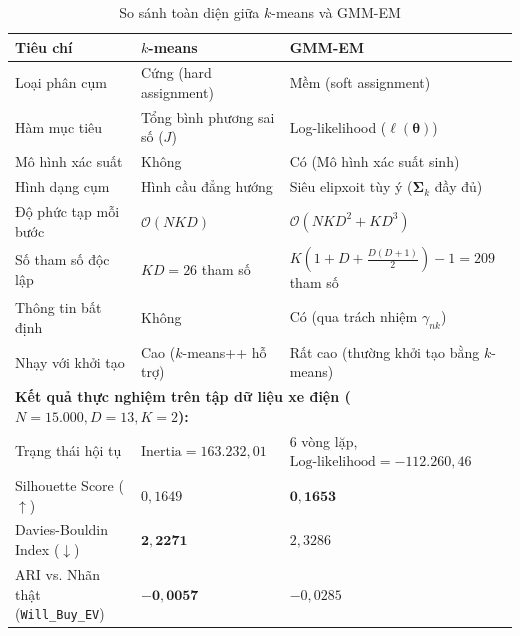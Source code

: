 \begin{table}[htbp]
  \centering
  \small
  \renewcommand{\arraystretch}{1.25}
  \caption{So sánh toàn diện giữa $k$-means và GMM-EM}
  \label{tab:kmeans_vs_gmm}
  \begin{tabularx}{\linewidth}{lXX}
    \toprule
    \textbf{Tiêu chí}         & \textbf{$k$-means}          & \textbf{GMM-EM} \\
    \midrule
    Loại phân cụm             & Cứng (hard assignment)      & Mềm (soft assignment) \\
    Hàm mục tiêu              & Tổng bình phương sai số ($J$) & Log-likelihood ($\ell(\boldsymbol{\theta})$) \\
    Mô hình xác suất          & Không                       & Có (Mô hình xác suất sinh) \\
    Hình dạng cụm             & Hình cầu đẳng hướng         & Siêu elipxoit tùy ý ($\boldsymbol{\Sigma}_k$ đầy đủ) \\
    Độ phức tạp mỗi bước      & $\mathcal{O}(NKD)$          & $\mathcal{O}(NKD^2 + KD^3)$ \\
    Số tham số độc lập        & $KD = 26$ tham số           & $K(1 + D + \frac{D(D+1)}{2}) - 1 = 209$ tham số \\
    Thông tin bất định        & Không                       & Có (qua trách nhiệm $\gamma_{nk}$) \\
    Nhạy với khởi tạo         & Cao ($k$-means++ hỗ trợ)    & Rất cao (thường khởi tạo bằng $k$-means) \\
    \midrule
    \multicolumn{3}{l}{\textbf{Kết quả thực nghiệm trên tập dữ liệu xe điện ($N = 15.000, D = 13, K = 2$):}} \\
    Trạng thái hội tụ         & $\text{Inertia} = 163.232{,}01$ & $6$ vòng lặp, $\text{Log-likelihood} = -112.260{,}46$ \\
        Silhouette Score ($\uparrow$)     & $0{,}1649$                  & $\mathbf{0{,}1653}$ \\
    Davies-Bouldin Index ($\downarrow$) & $\mathbf{2{,}2271}$       & $2{,}3286$ \\
    ARI vs. Nhãn thật (\texttt{Will\_Buy\_EV}) & $\mathbf{-0{,}0057}$ & $-0{,}0285$ \\
    \bottomrule
  \end{tabularx}
\end{table}

